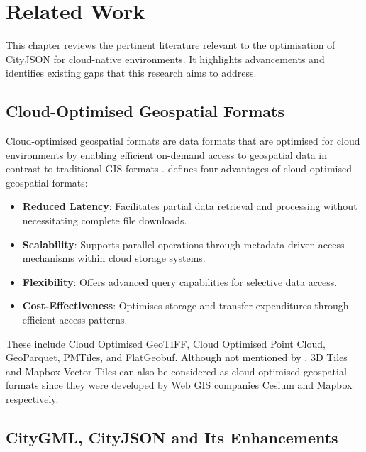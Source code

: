 
\chapter{Related Work}
\label{rw:related_work}
This chapter reviews the pertinent literature relevant to the optimisation of CityJSON for cloud-native environments. It highlights advancements and identifies existing gaps that this research aims to address.

\section{Cloud-Optimised Geospatial Formats}
\label{rw:cloud_optimised_formats}

Cloud-optimised geospatial formats are data formats that are optimised for cloud environments by enabling efficient on-demand access to geospatial data in contrast to traditional GIS formats \citep{cloud-optimised-formats}. \citet{cloud-optimised-formats} defines four advantages of cloud-optimised geospatial formats:

\begin{itemize}
  \item \textbf{Reduced Latency}: Facilitates partial data retrieval and processing without necessitating complete file downloads.
  \item \textbf{Scalability}: Supports parallel operations through metadata-driven access mechanisms within cloud storage systems.
  \item \textbf{Flexibility}: Offers advanced query capabilities for selective data access.
  \item \textbf{Cost-Effectiveness}: Optimises storage and transfer expenditures through efficient access patterns.
\end{itemize}

These include Cloud Optimised GeoTIFF, Cloud Optimised Point Cloud, GeoParquet, PMTiles, and FlatGeobuf. Although not mentioned by \citet{cloud-optimised-formats}, 3D Tiles \citep{3d_tiles} and Mapbox Vector Tiles \citep{mapbox-vector-tiles} can also be considered as cloud-optimised geospatial formats since they were developed by Web GIS companies Cesium and Mapbox respectively.

\section{CityGML, CityJSON and Its Enhancements}
\label{rw:cityjson_enhancements}

